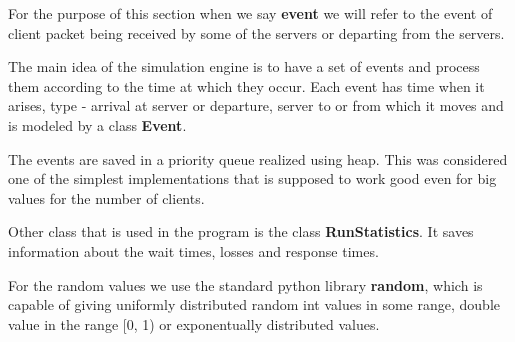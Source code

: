 \documentclass[12pt]{article}
\theoremstyle{plain}
\begin{document}
For the purpose of this section when we say \textbf{event} we will refer to the
event of client packet being received by some of the servers or departing from
the servers.

The main idea of the simulation engine is to have a set of events and process 
them according to the time at which they occur. Each event has time when it
arises, type - arrival at server or departure, server to or from which it moves
and is modeled by a class \textbf{Event}.

The events are saved in a priority queue realized using heap. This was
considered one of the simplest implementations that is supposed to work good 
even for big values for the number of clients.

Other class that is used in the program is the class \textbf{RunStatistics}. It
saves information about the wait times, losses and response times. 

For the random values we use the standard python library \textbf{random}, which
is capable of giving uniformly distributed random int values in some range,
double value in the range [0, 1) or exponentually distributed values.
\end{document}
